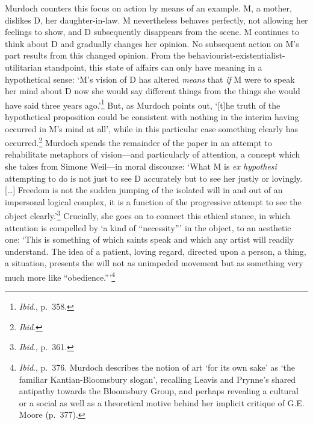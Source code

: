 \documentclass[]{article}
\begin{document}
Murdoch counters this focus on action by means of an example. M, a
mother, dislikes D, her daughter-in-law. M nevertheless behaves
perfectly, not allowing her feelings to show, and D subsequently
disappears from the scene. M continues to think about D and gradually
changes her opinion. No subsequent action on M’s part results from this
changed opinion. From the behaviourist-existentialist-utilitarian
standpoint, this state of affairs can only have meaning in a
hypothetical sense: ‘M’s vision of D has altered \emph{means} that
\emph{if} M were to speak her mind about D now she would say different
things from the things she would have said three years ago.’\footnote{\emph{Ibid}.,
  p.~358.} But, as Murdoch points out, ‘{[}t{]}he truth of the
hypothetical proposition could be consistent with nothing in the interim
having occurred in M’s mind at all’, while in this particular case
something clearly has occurred.\footnote{\emph{Ibid}.} Murdoch spends
the remainder of the paper in an attempt to rehabilitate metaphors of
vision—and particularly of attention, a concept which she takes from
Simone Weil—in moral discourse: ‘What M is \emph{ex hypothesi}
attempting to do is not just to see D accurately but to see her justly
or lovingly. {[}\ldots{}{]} Freedom is not the sudden jumping of the
isolated will in and out of an impersonal logical complex, it is a
function of the progressive attempt to see the object
clearly.’\footnote{\emph{Ibid}., p.~361.} Crucially, she goes on to
connect this ethical stance, in which attention is compelled by ‘a kind
of “necessity”’ in the object, to an aesthetic one: ‘This is something
of which saints speak and which any artist will readily understand. The
idea of a patient, loving regard, directed upon a person, a thing, a
situation, presents the will not as unimpeded movement but as something
very much more like “obedience.”’\footnote{\emph{Ibid}., p.~376. Murdoch
  describes the notion of art ‘for its own sake’ as ‘the familiar
  Kantian-Bloomsbury slogan’, recalling Leavis and Prynne’s shared
  antipathy towards the Bloomsbury Group, and perhaps revealing a
  cultural or a social as well as a theoretical motive behind her
  implicit critique of G.E. Moore (p.~377).}
\end{document}
